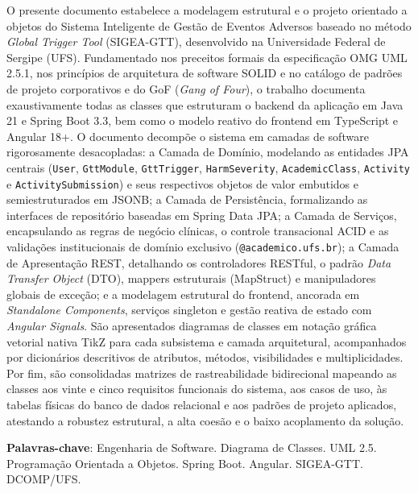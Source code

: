 \begin{resumo}
O presente documento estabelece a modelagem estrutural e o projeto orientado a objetos do Sistema Inteligente de Gestão de Eventos Adversos baseado no método \textit{Global Trigger Tool} (SIGEA-GTT), desenvolvido na Universidade Federal de Sergipe (UFS). Fundamentado nos preceitos formais da especificação OMG UML 2.5.1, nos princípios de arquitetura de software SOLID e no catálogo de padrões de projeto corporativos e do GoF (\textit{Gang of Four}), o trabalho documenta exaustivamente todas as classes que estruturam o backend da aplicação em Java 21 e Spring Boot 3.3, bem como o modelo reativo do frontend em TypeScript e Angular 18+. O documento decompõe o sistema em camadas de software rigorosamente desacopladas: a Camada de Domínio, modelando as entidades JPA centrais (\texttt{User}, \texttt{GttModule}, \texttt{GttTrigger}, \texttt{HarmSeverity}, \texttt{AcademicClass}, \texttt{Activity} e \texttt{ActivitySubmission}) e seus respectivos objetos de valor embutidos e semiestruturados em JSONB; a Camada de Persistência, formalizando as interfaces de repositório baseadas em Spring Data JPA; a Camada de Serviços, encapsulando as regras de negócio clínicas, o controle transacional ACID e as validações institucionais de domínio exclusivo (\texttt{@academico.ufs.br}); a Camada de Apresentação REST, detalhando os controladores RESTful, o padrão \textit{Data Transfer Object} (DTO), mappers estruturais (MapStruct) e manipuladores globais de exceção; e a modelagem estrutural do frontend, ancorada em \textit{Standalone Components}, serviços singleton e gestão reativa de estado com \textit{Angular Signals}. São apresentados diagramas de classes em notação gráfica vetorial nativa TikZ para cada subsistema e camada arquitetural, acompanhados por dicionários descritivos de atributos, métodos, visibilidades e multiplicidades. Por fim, são consolidadas matrizes de rastreabilidade bidirecional mapeando as classes aos vinte e cinco requisitos funcionais do sistema, aos casos de uso, às tabelas físicas do banco de dados relacional e aos padrões de projeto aplicados, atestando a robustez estrutural, a alta coesão e o baixo acoplamento da solução.

\vspace{\onelineskip}
\noindent
\textbf{Palavras-chave}: Engenharia de Software. Diagrama de Classes. UML 2.5. Programação Orientada a Objetos. Spring Boot. Angular. SIGEA-GTT. DCOMP/UFS.
\end{resumo}
